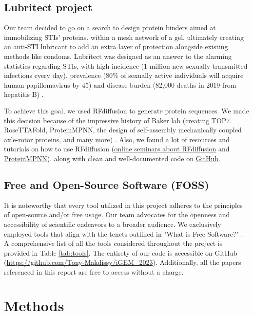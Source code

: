 \documentclass[11pt,a4paper]{article}
\begin{document}
\subsection{Lubritect project}

Our team decided to go on a search to design protein binders aimed at immobilizing STIs' proteins.
within a mesh network of a gel, ultimately creating an anti-STI lubricant to add an extra layer of protection alongside 
existing methods like condoms. 
Lubritect was designed
as an answer to the alarming statistics regarding STIs, with high incidence 
(1 million new sexually transmitted infections every day), 
prevalence (80\% of sexually active individuals will acquire human papillomavirus by 45)
and disease burden (82,000 deaths in 2019 from hepatitis B) \cite{paris_bettencourt_project}.

To achieve this goal, we used RFdiffusion to generate protein 
sequences. We made this decision because of the impressive history of
Baker lab (creating TOP7. RoseTTAFold, ProteinMPNN, the design
of self-assembly mechanically coupled axle-rotor proteins, and many more) \cite{bakerlab}.
Also, we found a lot of resources and tutorials on how to use RFdiffusion 
(\href{https://www.youtube.com/watch?v=wIHwHDt2NoI}{online seminars about RFdiffusion} and 
\href{https://youtu.be/aVQQuoToTJA?si=PnQvJluY3ZPHo4TO}{ProteinMPNN}).
along with clean and well-documented code on \href{https://github.com/RosettaCommons/RFdiffusion}{GitHub}.

\subsection{Free and Open-Source Software (FOSS)}

It is noteworthy that every tool utilized in this project adheres to the principles of open-source and/or free usage. Our team advocates for the openness and accessibility of scientific endeavors to a broader audience. We exclusively employed tools that align with the tenets outlined in "What is Free Software?" \cite{gun_foss}. A comprehensive list of all the tools considered throughout the project is provided in Table \ref{tab:tools}.
The entirety of our code is accessible on GitHub (\url{https://github.com/Tony-Makdissy/iGEM_2023}).
Additionally, all the papers referenced in this report are free to access without a charge.

\section{Methods}
\end{document}
